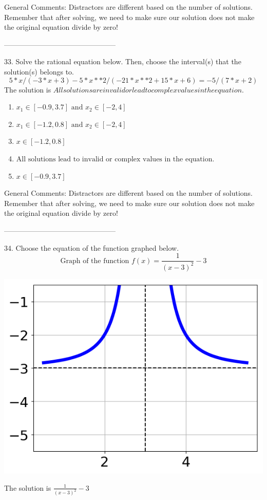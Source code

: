 \documentclass{article}[10pt]
\begin{document}
General Comments: Distractors are different based on the number of solutions. Remember that after solving, we need to make sure our solution does not make the original equation divide by zero!

-----------------------------------------------

33. Solve the rational equation below. Then, choose the interval(s) that the solution(s) belongs to.
$$ 5*x/(-3*x + 3) - 5*x**2/(-21*x**2 + 15*x + 6) = -5/(7*x + 2) $$ 
The solution is $ All solutions are invalid or lead to complex values in the equation. $ 

\begin{enumerate}[label=\Alph*.] 
\item $ x_1 \in [-0.9, 3.7] \text{ and } x_2 \in [-2,4] $ 

  
\item $ x_1 \in [-1.2, 0.8] \text{ and } x_2 \in [-2,4] $ 

  
\item $ x \in [-1.2,0.8] $ 

  
\item $ \text{All solutions lead to invalid or complex values in the equation.} $ 

  
\item $ x \in [-0.9,3.7] $ 

  
\end{enumerate} 
 
General Comments: Distractors are different based on the number of solutions. Remember that after solving, we need to make sure our solution does not make the original equation divide by zero!

-----------------------------------------------

34. Choose the equation of the function graphed below.
$$ \text{Graph of the function } f(x) = \frac{1}{(x - 3)^2} - 3 $$ 
\begin{center}\includegraphics[scale=0.5]{../Figures/question34A.png}\end{center}The solution is $ \frac{1}{(x - 3)^2} - 3 $ 
\end{document}
